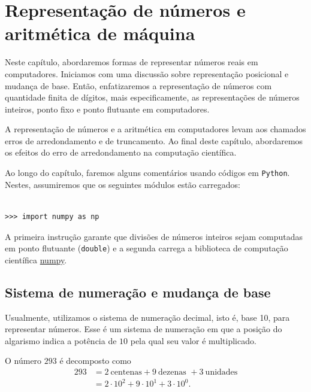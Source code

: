 %

\chapter{Representação de números e aritmética de máquina}

Neste capítulo, abordaremos formas de representar números reais em computadores. Iniciamos com uma discussão sobre representação posicional e mudança de base. Então, enfatizaremos a representação de números com quantidade finita de dígitos, mais especificamente, as representações de números inteiros, ponto fixo e ponto flutuante em computadores.

A representação de números e a aritmética em computadores levam aos chamados erros de arredondamento e de truncamento. Ao final deste capítulo, abordaremos os efeitos do erro de arredondamento na computação científica.

\ifispython
Ao longo do capítulo, faremos alguns comentários usando códigos em \verb+Python+. Nestes, assumiremos que os seguintes módulos estão carregados:
\begin{verbatim}

>>> import numpy as np
\end{verbatim}
A primeira instrução garante que divisões de números inteiros sejam computadas em ponto flutuante (\verb+double+) e a segunda carrega a biblioteca de computação científica \href{http://www.numpy.org/}{numpy}.
\fi
\section{Sistema de numeração e mudança de base}
Usualmente, utilizamos o sistema de numeração decimal, isto é, base 10, para representar números. Esse é um sistema de numeração em que a posição do algarismo indica a potência de $10$ pela qual seu valor é multiplicado.

\begin{ex}
  O número $293$ é decomposto como
  \begin{equation}
    \begin{split}
      293 &= 2\ \text{centenas} + 9\ \text{dezenas }+ 3\ \text{unidades}\\
      &= 2\cdot 10^2+9\cdot 10^1+3\cdot 10^0.
    \end{split}
  \end{equation}
\end{ex}

